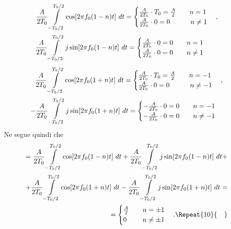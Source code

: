 \documentclass[12pt,oneside,openany]{memoir}
\numberwithin{equation}{subsection}
\newcommand{\quads}[1]{\Repeat{#1}{\quad}}
\newcommand{\dt}{\ dt}
\begin{document}
\begin{equation}
	\begin{split}
		\frac{A}{2 T_0} \int\displaylimits_{-T_0/2}^{T_0/2} \cos[2 \pi f_0 (1 - n) t] \dt =
			\begin{cases}
				\frac{A}{2 T_0} \cdot T_0 = \frac{A}{2} \quad\quad n = 1\\
				\frac{A}{2 T_0} \cdot 0 = 0 \quad\quad \ \ \ n \neq 1
			\end{cases},
		\\
		\frac{A}{2 T_0} \int\displaylimits_{-T_0/2}^{T_0/2} j \sin[2 \pi f_0 (1 - n) t] \dt =
			\begin{cases}
				\frac{A}{2 T_0} \cdot 0 = 0 \quad\quad n = 1\\
				\frac{A}{2 T_0} \cdot 0 = 0 \quad\quad n \neq 1
			\end{cases}
			\quad
	\end{split}
\end{equation}
\begin{equation}
	\begin{split}
		\frac{A}{2 T_0} \int\displaylimits_{-T_0/2}^{T_0/2} \cos[2 \pi f_0 (1 + n) t] \dt =
			\begin{cases}
				\frac{A}{2 T_0} \cdot T_0 = \frac{A}{2} \quad\quad n = -1\\
				\frac{A}{2 T_0} \cdot 0 = 0 \quad\quad \ \ \ n \neq -1
			\end{cases},
		\\
		-\frac{A}{2 T_0} \int\displaylimits_{-T_0/2}^{T_0/2} j \sin[2 \pi f_0 (1 + n) t] \dt =
			\begin{cases}
				-\frac{A}{2 T_0} \cdot 0 = 0 \quad\quad n = -1\\
				-\frac{A}{2 T_0} \cdot 0 = 0 \quad\quad n \neq -1
			\end{cases}
	\end{split}
\end{equation}
Ne segue quindi che
\begin{equation}
	\begin{split}
		= \frac{A}{2 T_0} \int\displaylimits_{-T_0/2}^{T_0/2} 
		\cos[2 \pi f_0 (1 - n) t] \dt + \frac{A}{2 T_0} 
		\int\displaylimits_{-T_0/2}^{T_0/2} j \sin[2 \pi f_0 (1 - n) t] 
		\dt +
		\\
		+ \frac{A}{2 T_0} \int\displaylimits_{-T_0/2}^{T_0/2}
		\cos[2 \pi f_0 (1 + n) t] \dt - \frac{A}{2 T_0}
		\int\displaylimits_{-T_0/2}^{T_0/2} j \sin[2 \pi f_0 (1 + n) t]
		\dt =
		\\
		=
		\begin{cases}
			\frac{A}{2} \quad\quad n = \pm 1\\
			0 \quad\quad \ n \neq \pm 1
		\end{cases}.
		\quads{10}
	\end{split}
\end{equation}
\end{document}
